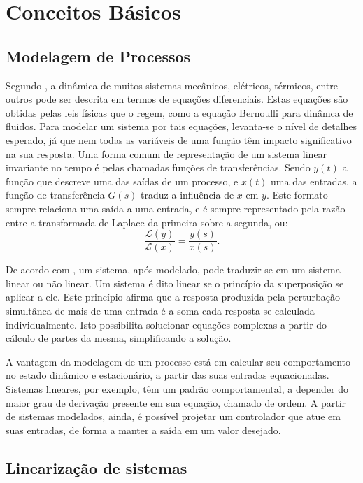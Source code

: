 \chapter{Conceitos Básicos}

\section{Modelagem de Processos}

Segundo , a dinâmica de muitos sistemas mecânicos, elétricos, térmicos, entre outros pode ser descrita em termos de equações diferenciais. Estas equações são obtidas pelas leis físicas que o regem, como a equação Bernoulli para dinâmca de fluidos. Para modelar um sistema por tais equações, levanta-se o nível de detalhes esperado, já que nem todas as variáveis de uma função têm impacto significativo na sua resposta. Uma forma comum de representação de um sistema linear invariante no tempo é pelas chamadas funções de transferências. Sendo $y(t)$ a função que descreve uma das saídas de um processo, e $x(t)$ uma das entradas, a função de transferência $G(s)$ traduz a influência de $x$ em $y$. Este formato sempre relaciona uma saída a uma entrada, e é sempre representado pela razão entre a transformada de Laplace da primeira sobre a segunda, ou:
\begin{equation}
\frac{\mathcal{L}(y)}{\mathcal{L}(x)} = \frac{y{(s)}}{x(s)}.
\end{equation}

De acordo com , um sistema, após modelado, pode traduzir-se em um sistema linear ou não linear. Um sistema é dito linear se o princípio da superposição se aplicar a ele. Este princípio afirma que a resposta produzida pela perturbação simultânea de mais de uma entrada é a soma cada resposta se calculada individualmente. Isto possibilita solucionar equações complexas a partir do cálculo de partes da mesma, simplificando a solução.

A vantagem da modelagem de um processo está em calcular seu comportamento no estado dinâmico e estacionário, a partir das suas entradas equacionadas. Sistemas lineares, por exemplo, têm um padrão comportamental, a depender do maior grau de derivação presente em sua equação, chamado de ordem. A partir de sistemas modelados, ainda, é possível projetar um controlador que atue em suas entradas, de forma a manter a saída em um valor desejado.

\section{Linearização de sistemas}

